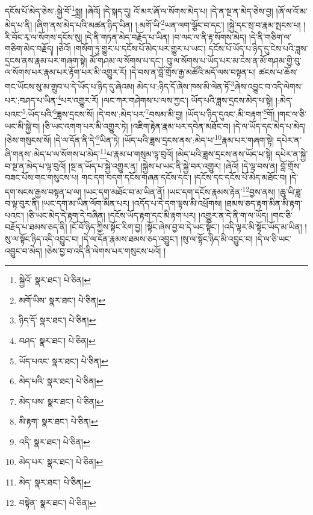 དངོས་པོ་མེད་ཅེས་:སྐྱེ་བོ་\footnote{སྐྱེའོ་  སྣར་ཐང་།  པེ་ཅིན། }སྨྲ། །ཞེའོ། །དེ་སྐད་དུ། འོ་མར་ཞོ་ལ་སོགས་མེད་པ། །དེ་ན་སྔ་ན་མེད་ཅེས་བྱ། །ཞོ་ལ་འོ་མ་མེད་པ་ནི། །ཞིག་ནས་མེད་པའི་མཚན་ཉིད་ཡིན། །:མགོ་ཡི་\footnote{མགོ་ཡིས་  སྣར་ཐང་།  པེ་ཅིན། }ཡན་ལག་ལྕོང་བ་དང་། །སྐྱེ་དང་སྲ་བ་རྣམ་སྤངས་པ། །རི་བོང་རྭ་ལ་སོགས་དངོས་སུ། །དེ་ནི་གཏན་མེད་བརྗོད་པ་ཡིན། །བ་ལང་ལ་ནི་རྟ་སོགས་མེད། །དེ་ནི་གཅིག་ལ་གཅིག་མེད་བརྗོད། །ཅེའོ། །གསོག་ཏུ་གྱུར་པ་དངོས་པོ་མེད་པར་གྱུར་པ་ཡང་། དངོས་པོ་ཡོད་པ་ཉིད་དུ་ངེས་པའི་ཟླས་དྲངས་ནས་རྣམ་པར་གཞག་སྟེ། མོ་གཤམ་ལ་སོགས་པ་དང་། བུ་ལ་སོགས་པ་ཡོད་པར་མ་ངེས་ན་མོ་གཤམ་གྱི་བུ་ལ་སོགས་པར་རྣམ་པར་རྟོག་པར་མི་འགྱུར་རོ། །དེ་བས་ན་བློ་གྲོས་རྒྱ་མཚོའི་མདོ་ལས་བསྟན་པ། ཚངས་པ་ཆོས་གང་ཡོངས་སུ་མ་གྲུབ་པ་དེ་ཡོད་པ་ཉིད་དུ་ཞེའམ། མེད་པ་:ཉིད་དོ་ཞེས་ཁས་མི་ལེན་ཏོ་\footnote{ཉིད་དོ་  སྣར་ཐང་།  པེ་ཅིན། }ཞེས་འབྱུང་བ་འདི་ལེགས་པར་:བཤད་པ་ཡིན་\footnote{བཤད་  སྣར་ཐང་།  པེ་ཅིན། }པར་འགྱུར་རོ། །ལང་ཀར་གཤེགས་པ་ལས་ཀྱང་། ཡོད་པའི་ཟླས་དྲངས་མེད་པ་སྟེ། །:མེད་པའང་\footnote{ཡོད་པའང་  སྣར་ཐང་།  པེ་ཅིན། }:ཡོད་པའི་\footnote{མེད་པའི་  སྣར་ཐང་།  པེ་ཅིན། }ཟླས་དྲངས་སོ། །དེ་བས་:མེད་པར་\footnote{མེད་པས་  སྣར་ཐང་།  པེ་ཅིན། }བསམ་མི་བྱ། །ཡོད་པ་ཉིད་དུའང་:མི་བརྟག་\footnote{མི་རྟག་  སྣར་ཐང་།  པེ་ཅིན། }གོ། །གང་ལ་ཅི་ཡང་མི་སྐྱེ་བ། །ཅི་ཡང་འགག་པར་མི་འགྱུར་ཏེ། །འཇིག་རྟེན་རྣམ་པར་དབེན་མཐོང་བ། །དེ་ལ་ཡོད་དང་མེད་པ་མེད། །ཅེས་གསུངས་སོ། །དེ་ལ་དོན་ནི་དེ་\footnote{འདི་  སྣར་ཐང་།  པེ་ཅིན། }ཡིན་ཏེ། །ཡོད་པའི་ཟླས་དྲངས་ནས་:མེད་པ་\footnote{མེད་པར་  སྣར་ཐང་།  པེ་ཅིན། }རྣམ་པར་གཞག་སྟེ། དཔེར་ན་ཞི་གནས་:མེད་པ་ལ་སོགས་པ་མེད་\footnote{མེད་  སྣར་ཐང་།  པེ་ཅིན། }པ་རྣམ་པ་གསུམ་ལྟ་བུའོ། །མེད་པའི་ཟླས་དྲངས་ནས་ཡོད་པ་སྟེ། དཔེར་ན་སྐྱེ་བ་སྔ་ན་མེད་པ་ལྟ་བུའོ། །སྔ་ན་ཡོད་པ་སྐྱེ་འགྱུར་ན། །སྐྱེས་པ་ཡང་ནི་སྐྱེ་བར་འགྱུར། །ཞེའོ། །དེ་ལྟ་བས་ན། བློ་གྲོས་བཟང་པོས་གང་གསུངས་པ། གང་དག་བདག་དངོས་གཞན་དངོས་དང་། །དངོས་དང་དངོས་པོ་མེད་མཐོང་བ། །དེ་དག་སངས་རྒྱས་བསྟན་པ་ལ། །ཡང་དག་མཐོང་བ་མ་ཡིན་ནོ། །ཡང་དག་དངོས་རྣམས་རྟེན་\footnote{བསྟེན་  སྣར་ཐང་།  པེ་ཅིན། }བྱས་ནས། །ཆུ་ཡི་ཟླ་བ་ལྟ་བུར་ནི། །ཡང་དག་མ་ཡིན་ལོག་མིན་པར། །འདོད་པ་དེ་དག་ལྟས་མི་འཕྲོགས། །ཐམས་ཅད་རྟག་མིན་མི་རྟག་པའང་། །ཅི་ཡང་མེད་དེ་རྟག་དེ་བཞིན། །དངོས་ཡོད་རྟག་དང་མི་རྟག་པར། །འགྱུར་ན་དེ་ནི་ག་ལ་ཡོད། །གང་ཅི་བརྗོད་པ་ཐམས་ཅད་ནི། །ངོ་བོ་ཉིད་ཀྱིས་སྟོང་རིག་བྱ། །སྟོང་ཞེས་བྱ་བ་དེ་ཡང་སྟོང་། །འདི་ལྟར་མི་སྟོང་ཡོད་མ་ཡིན། །སུ་ལ་སྟོང་ཉིད་འདི་འབྱུང་བ། །དེ་ལ་དོན་རྣམས་ཐམས་ཅད་འབྱུང་། །སུ་ལ་སྟོང་ཉིད་མི་འབྱུང་བ། །དེ་ལ་ཅི་ཡང་འབྱུང་བ་མེད། །ཅེས་བྱ་བ་འདི་ནི་ལེགས་པར་གསུངས་པའོ། །
